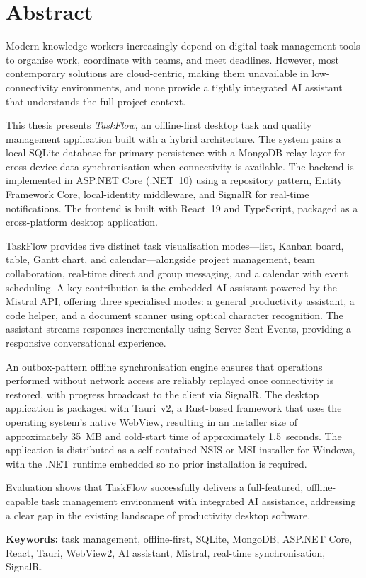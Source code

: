 \chapter*{Abstract}
\label{chap:abstract}
\pagestyle{plain}

Modern knowledge workers increasingly depend on digital task management tools to organise work, coordinate with teams, and meet deadlines. However, most contemporary solutions are cloud-centric, making them unavailable in low-connectivity environments, and none provide a tightly integrated AI assistant that understands the full project context.

This thesis presents \textit{TaskFlow}, an offline-first desktop task and quality management application built with a hybrid architecture. The system pairs a local SQLite database for primary persistence with a MongoDB relay layer for cross-device data synchronisation when connectivity is available. The backend is implemented in ASP.NET Core (.NET~10) using a repository pattern, Entity Framework Core, local-identity middleware, and SignalR for real-time notifications. The frontend is built with React~19 and TypeScript, packaged as a cross-platform desktop application.

TaskFlow provides five distinct task visualisation modes---list, Kanban board, table, Gantt chart, and calendar---alongside project management, team collaboration, real-time direct and group messaging, and a calendar with event scheduling. A key contribution is the embedded AI assistant powered by the Mistral API, offering three specialised modes: a general productivity assistant, a code helper, and a document scanner using optical character recognition. The assistant streams responses incrementally using Server-Sent Events, providing a responsive conversational experience.

An outbox-pattern offline synchronisation engine ensures that operations performed without network access are reliably replayed once connectivity is restored, with progress broadcast to the client via SignalR. The desktop application is packaged with Tauri~v2, a Rust-based framework that uses the operating system's native WebView, resulting in an installer size of approximately 35~MB and cold-start time of approximately 1.5~seconds. The application is distributed as a self-contained NSIS or MSI installer for Windows, with the .NET runtime embedded so no prior installation is required.

Evaluation shows that TaskFlow successfully delivers a full-featured, offline-capable task management environment with integrated AI assistance, addressing a clear gap in the existing landscape of productivity desktop software.

\vspace{1em}
\noindent\textbf{Keywords:} task management, offline-first, SQLite, MongoDB, ASP.NET Core, React, Tauri, WebView2, AI assistant, Mistral, real-time synchronisation, SignalR.
